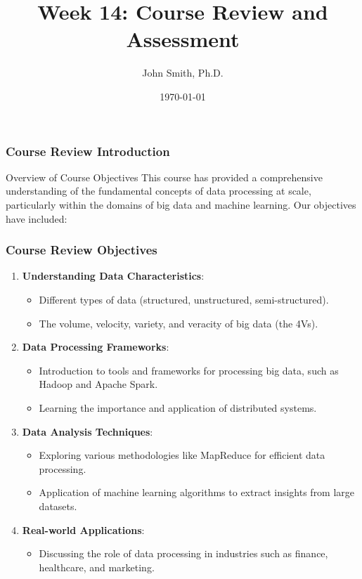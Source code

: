 \documentclass[aspectratio=169]{beamer}
\title[Academic Template]{Week 14: Course Review and Assessment}
\author[J. Smith]{John Smith, Ph.D.}
\institute[University Name]{
  Department of Computer Science\\
  University Name\\
  \vspace{0.3cm}
  Email: email@university.edu\\
  Website: www.university.edu
}
\date{\today}
\begin{document}
\frame{\titlepage}

\begin{frame}[fragile]
    \frametitle{Course Review Introduction}
    \begin{block}{Overview of Course Objectives}
        This course has provided a comprehensive understanding of the fundamental concepts of data processing at scale, particularly within the domains of big data and machine learning. Our objectives have included:
    \end{block}
\end{frame}

\begin{frame}[fragile]
    \frametitle{Course Review Objectives}
    \begin{enumerate}
        \item \textbf{Understanding Data Characteristics}:
        \begin{itemize}
            \item Different types of data (structured, unstructured, semi-structured).
            \item The volume, velocity, variety, and veracity of big data (the 4Vs).
        \end{itemize}

        \item \textbf{Data Processing Frameworks}:
        \begin{itemize}
            \item Introduction to tools and frameworks for processing big data, such as Hadoop and Apache Spark.
            \item Learning the importance and application of distributed systems.
        \end{itemize}

        \item \textbf{Data Analysis Techniques}:
        \begin{itemize}
            \item Exploring various methodologies like MapReduce for efficient data processing.
            \item Application of machine learning algorithms to extract insights from large datasets.
        \end{itemize}

        \item \textbf{Real-world Applications}:
        \begin{itemize}
            \item Discussing the role of data processing in industries such as finance, healthcare, and marketing.
        \end{itemize}
    \end{enumerate}
\end{frame}
\end{document}
